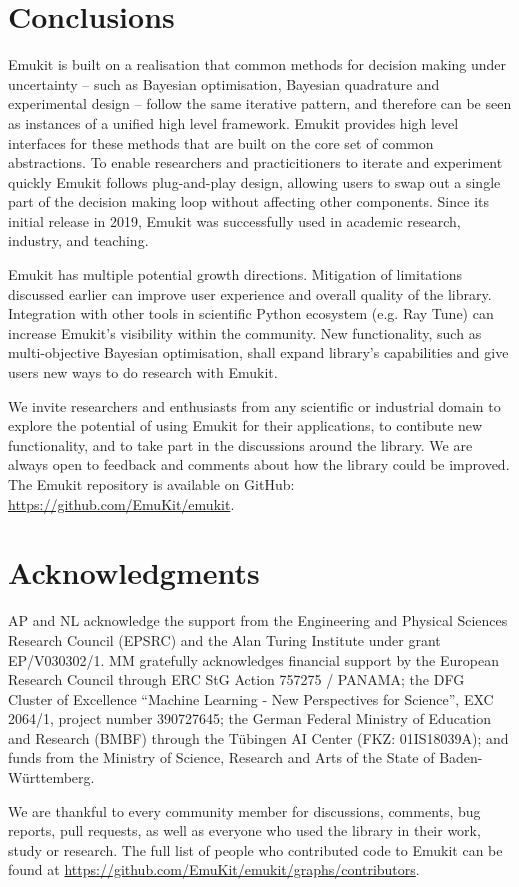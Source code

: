 \section{Conclusions}
Emukit is built on a realisation that common methods for decision making under uncertainty -- such as Bayesian optimisation, Bayesian quadrature and experimental design -- follow the same iterative pattern, and therefore can be seen as instances of a unified high level framework. Emukit provides high level interfaces for these methods that are built on the core set of common abstractions. To enable researchers and practicitioners to iterate and experiment quickly Emukit follows plug-and-play design, allowing users to swap out a single part of the decision making loop without affecting other components. Since its initial release in 2019, Emukit was successfully used in academic research, industry, and teaching.

Emukit has multiple potential growth directions. Mitigation of limitations discussed earlier can improve user experience and overall quality of the library. Integration with other tools in scientific Python ecosystem (e.g. Ray Tune) can increase Emukit's visibility within the community. New functionality, such as multi-objective Bayesian optimisation, shall expand library's capabilities and give users new ways to do research with Emukit.

We invite researchers and enthusiasts from any scientific or industrial domain to explore the potential of using Emukit for their applications, to contibute new functionality, and to take part in the discussions around the library. We are always open to feedback and comments about how the library could be improved. The Emukit repository is available on GitHub: \url{https://github.com/EmuKit/emukit}.

\section{Acknowledgments}
AP and NL acknowledge the support from the Engineering and Physical Sciences Research Council (EPSRC) and the Alan Turing Institute under grant EP/V030302/1. MM gratefully acknowledges financial support by the European Research Council through ERC StG Action 757275 / PANAMA; the DFG Cluster of Excellence “Machine Learning - New Perspectives for Science”, EXC 2064/1, project number 390727645; the German Federal Ministry of Education and Research (BMBF) through the T\"{u}bingen AI Center (FKZ: 01IS18039A); and funds from the Ministry of Science, Research and Arts of the State of Baden-W\"{u}rttemberg.

We are thankful to every community member for discussions, comments, bug reports, pull requests, as well as everyone who used the library in their work, study or research. The full list of people who contributed code to Emukit can be found at \url{https://github.com/EmuKit/emukit/graphs/contributors}.
